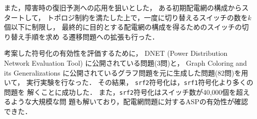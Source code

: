 \documentclass{abstB}
\newcommand{\code}[1]{\lstinline[basicstyle=\ttfamily]{#1}}
\begin{document}
{また，障害時の復旧予測への応用を狙いとした，
ある初期配電網の構成からスタートして，
トポロジ制約を満たした上で，一度に切り替えるスイッチの数を$k$個以下に制限し，
最終的に目的とする配電網の構成を得るためのスイッチの切り替え手順を求め
る遷移問題への拡張も行った．

考案した符号化の有効性を評価するために，
DNET (Power Distribution Network Evaluation Tool)
に公開されている問題(3問)と，
Graph Coloring and its Generalizations
に公開されているグラフ問題を元に生成した問題(82問)を用いて，
実行実験を行なった．
その結果，
\code{srf2}符号化は，\code{srf1}符号化より多くの問題を
解くことに成功した．
また，\code{srf2}符号化はスイッチ数が40,000個を超えるような大規模な問
題も解いており，配電網問題に対するASPの有効性が確認できた．

}
\end{document}
